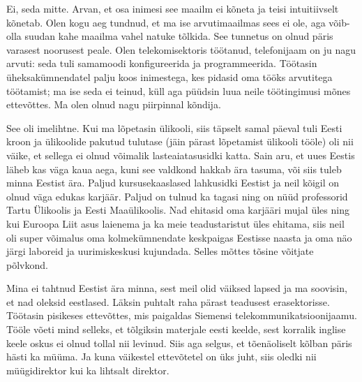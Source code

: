 
Ei, seda mitte. Arvan, et osa 
inimesi see maailm ei kõneta ja teisi intuitiivselt kõnetab. 
Olen kogu aeg tundnud, et ma ise arvutimaailmas sees ei ole, aga võib-olla suudan kahe 
maailma vahel natuke tõlkida. See tunnetus on olnud päris varasest 
noorusest peale. Olen telekomisektoris töötanud, telefonijaam on ju nagu
arvuti: seda tuli samamoodi konfigureerida ja programmeerida. Töötasin üheksakümnendatel
palju koos inimestega, kes pidasid oma tööks arvutitega töötamist; ma ise seda ei teinud, küll aga püüdsin luua neile töötingimusi mõnes 
ettevõttes. Ma olen olnud nagu piirpinnal kõndija.


See oli imelihtne. Kui ma lõpetasin ülikooli, siis täpselt samal päeval tuli 
Eesti kroon ja ülikoolide pakutud tulutase 
(jäin pärast lõpetamist ülikooli tööle) oli nii väike, et sellega ei olnud 
võimalik lasteaiatasusidki katta. Sain aru, et 
uues Eestis läheb kas väga kaua aega, kuni see valdkond hakkab ära tasuma, või 
siis tuleb minna Eestist ära. Paljud kursusekaaslased lahkusidki Eestist 
ja neil kõigil on olnud väga edukas karjäär. Paljud on tulnud ka
tagasi ning on nüüd professorid Tartu Ülikoolis ja Eesti Maaülikoolis. Nad
ehitasid oma karjääri mujal üles ning kui Euroopa Liit asus 
laienema ja ka meie teadustaristut üles ehitama, siis neil oli super võimalus 
oma kolmekümnendate keskpaigas Eestisse naasta ja oma näo järgi 
laboreid ja uurimiskeskusi kujundada. Selles mõttes tõsine võitjate põlvkond.
 
Mina ei tahtnud Eestist ära minna, sest meil olid väiksed lapsed ja ma 
soovisin, et nad oleksid eestlased. Läksin puhtalt 
raha pärast teadusest erasektorisse. Töötasin pisikeses ettevõttes, mis paigaldas Siemensi 
telekommunikatsioonijaamu. Tööle võeti mind selleks, et tõlgiksin materjale eesti keelde, sest korralik inglise keele 
oskus ei olnud tollal nii levinud. Siis aga selgus, et tõenäoliselt kõlban 
päris hästi ka müüma. Ja kuna väikestel ettevõtetel on üks juht, siis 
oledki nii müügidirektor kui ka lihtsalt direktor. 


